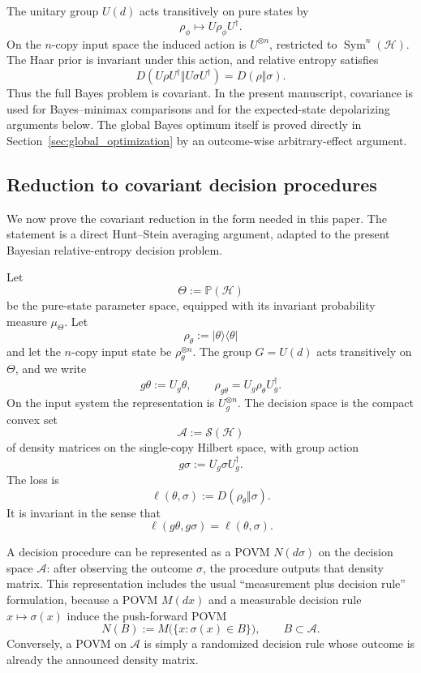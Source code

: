 \documentclass[journal]{IEEEtran}
\newcommand{\ket}[1]{\lvert #1\rangle}
\newcommand{\bra}[1]{\langle #1\rvert}
\begin{document}
The unitary group \(U(d)\) acts transitively on pure states by
\[
    \rho_\phi\longmapsto U\rho_\phi U^\dagger.
\]
On the \(n\)-copy input space the induced action is \(U^{\otimes n}\),
restricted to \(\operatorname{Sym}^n(\mathcal H)\).  The Haar prior is
invariant under this action, and relative entropy satisfies
\[
    D(U\rho U^\dagger\Vert U\sigma U^\dagger)
    =
    D(\rho\Vert\sigma).
\]
Thus the full Bayes problem is covariant.  In the present manuscript,
covariance is used for Bayes--minimax comparisons and for the expected-state
depolarizing arguments below.  The global Bayes optimum itself is proved
directly in Section~\ref{sec:global_optimization} by an outcome-wise
arbitrary-effect argument.

\subsection{Reduction to covariant decision procedures}
\label{subsec:covariant_povm_reduction}

We now prove the covariant reduction in the form needed in this paper.  The
statement is a direct Hunt--Stein averaging argument, adapted to the present
Bayesian relative-entropy decision problem.

Let
\[
    \Theta:=\mathbb P(\mathcal H)
\]
be the pure-state parameter space, equipped with its invariant probability
measure \(\mu_\Theta\).  Let
\[
    \rho_\theta:=\ket{\theta}\bra{\theta}
\]
and let the \(n\)-copy input state be \(\rho_\theta^{\otimes n}\).  The group
\(G=U(d)\) acts transitively on \(\Theta\), and we write
\[
    g\theta:=U_g\theta,
    \qquad
    \rho_{g\theta}=U_g\rho_\theta U_g^\dagger.
\]
On the input system the representation is \(U_g^{\otimes n}\).  The decision
space is the compact convex set
\[
    \mathcal A:=\mathcal S(\mathcal H)
\]
of density matrices on the single-copy Hilbert space, with group action
\[
    g\sigma:=U_g\sigma U_g^\dagger.
\]
The loss is
\[
    \ell(\theta,\sigma)
    :=
    D(\rho_\theta\Vert\sigma).
\]
It is invariant in the sense that
\[
    \ell(g\theta,g\sigma)=\ell(\theta,
    \sigma).
\]

A decision procedure can be represented as a POVM \(N(d\sigma)\) on the
decision space \(\mathcal A\): after observing the outcome \(\sigma\), the
procedure outputs that density matrix.  This representation includes the usual
``measurement plus decision rule'' formulation, because a POVM \(M(dx)\) and a
measurable decision rule \(x\mapsto\sigma(x)\) induce the push-forward POVM
\[
    N(B):=M\bigl(\{x:\sigma(x)\in B\}\bigr),
    \qquad B\subset\mathcal A.
\]
Conversely, a POVM on \(\mathcal A\) is simply a randomized decision rule whose
outcome is already the announced density matrix.
\end{document}
